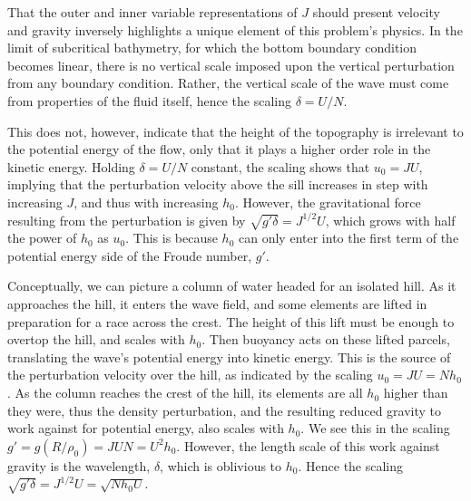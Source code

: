 \documentclass[12pt]{article}
\begin{document}
		That the outer and inner variable representations of $J$ should present velocity and gravity inversely highlights a unique element of this problem's physics. In the limit of subcritical bathymetry, for which the bottom boundary condition becomes linear,  there is no vertical scale imposed upon the vertical perturbation from any boundary condition. Rather, the vertical scale of the wave must come from properties of the fluid itself, hence the scaling $\delta = U/N$. 
	
	This does not, however, indicate that the height of the topography is irrelevant to the potential energy of the flow, only that it plays a higher order role in the kinetic energy. Holding $\delta=U/N$ constant, the scaling shows that $u_0 = J U$, implying that the perturbation velocity above the sill increases in step with increasing $J$, and thus with increasing $h_0$. However, the gravitational force resulting from the perturbation is given by $\sqrt{g'\delta} = J^{1/2} U$, which grows with half the power of $h_0$ as $u_0$. This is because $h_0$ can only enter into the first term of the potential energy side of the Froude number, $g'$. 
	
	Conceptually, we can picture a column of water headed for an isolated hill. As it approaches the hill, it enters the wave field, and some elements are lifted in preparation for a race across the crest. The height of this lift must be enough to overtop the hill, and scales with $h_0$. Then buoyancy acts on these lifted parcels, translating the wave's potential energy into kinetic energy. This is the source of the perturbation velocity over the hill, as indicated by the scaling $u_0=JU=Nh_0$.  As the column reaches the crest of the hill, its elements are all $h_0$ higher than they were, thus the density perturbation, and the resulting reduced gravity to work against for potential energy, also scales with $h_0$. We see this in the scaling $g'=g (R/\rho_0)=JUN=U^2h_0$. However, the length scale of this work against gravity is the wavelength, $\delta$, which is oblivious to $h_0$. Hence the scaling $\sqrt{g'\delta} = J^{1/2} U = \sqrt{Nh_0U}$. 
	
\end{document}

